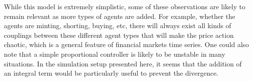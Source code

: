 \documentclass{article}
\begin{document}
    While this model is extremely simplistic, some of these observations are likely to remain relevant as more types of agents are added. For example, whether the agents are minting, shorting, buying, etc, there will always exist all kinds of couplings between these different agent types that will make the price action chaotic, which is a general feature of financial markets time series. One could also note that a simple proportional controller is likely to be unstable in many situations. In the simulation setup presented here, it seems that the addition of an integral term would be particularly useful to prevent the divergence.
\end{document}
